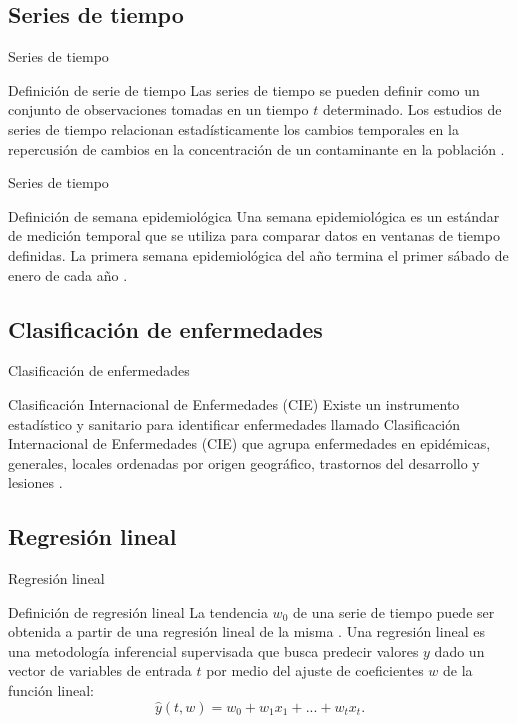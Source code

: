 \documentclass[11pt]{beamer}
\begin{document}
\subsection{Series de tiempo}
\begin{frame}{Series de tiempo}
\begin{block}{Definición de serie de tiempo} \justifying
Las series de tiempo se pueden definir como un conjunto de observaciones tomadas en un tiempo $t$ determinado. Los estudios de series de tiempo relacionan estadísticamente los cambios temporales en la repercusión de cambios en la concentración de un contaminante en la población \citep{r8}.
\end{block}
\end{frame}
\begin{frame}{Series de tiempo}
\begin{block}{Definición de semana epidemiológica} \justifying
Una semana epidemiológica es un estándar de medición temporal que se utiliza para comparar datos en ventanas de tiempo definidas. La primera semana epidemiológica del año termina el primer sábado de enero de cada año \citep{r7}.
\end{block}
\end{frame}
\subsection{Clasificación de enfermedades}
\begin{frame}{Clasificación de enfermedades}
\begin{block}{Clasificación Internacional de Enfermedades (CIE)} \justifying
Existe un instrumento estadístico y sanitario para identificar enfermedades llamado Clasificación Internacional de Enfermedades (CIE) que agrupa enfermedades en epidémicas, generales, locales ordenadas por origen geográfico, trastornos del desarrollo y lesiones \citep{r9}.
\end{block}
\end{frame}
\subsection{Regresión lineal}
\begin{frame}{Regresión lineal}
\begin{block}{Definición de regresión lineal} \justifying
La tendencia $w_0$ de una serie de tiempo puede ser obtenida a partir de una regresión lineal de la misma \citep{r10}. Una regresión lineal es una metodología inferencial supervisada que busca predecir valores $y$ dado un vector de variables de entrada $t$ por medio del ajuste de coeficientes $w$ de la función lineal: 
\begin{equation}
    \hat{y}(t,w) = w_0 + w_1x_1 + ... + w_tx_t.
    \label{eq1}
\end{equation}
\end{block}
\end{frame}
\end{document}
